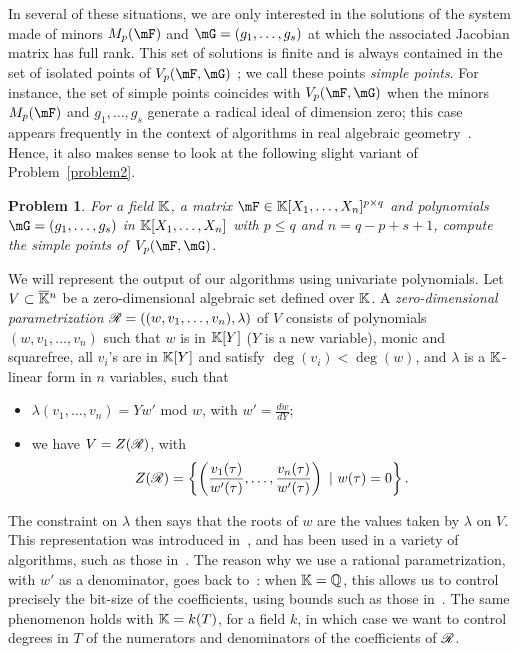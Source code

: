\documentclass[12pt]{article}
\newtheorem{pbm}{Problem}
\begin{document}
In several of these situations, we are only interested in the
solutions of the system made of minors $M_p(\mF)$ and
$\mG=(g_1,\dots,g_s)$ at which the associated Jacobian matrix has full
rank. This set of solutions is finite and is always contained in the
set of isolated points of $\VpFG{p}{\mF}{\mG}$ \cite[Theorem
  16.19]{Eisenbud95}; we call these points {\em simple points}. For
instance, the set of simple points coincides with $\VpFG{p}{\mF}{\mG}$
when the minors $M_p(\mF)$ and $g_1,\dots,g_s$ generate a radical
ideal of dimension zero; this case appears frequently in the context
of algorithms in real algebraic geometry~\cite{BGHSS}.  Hence, it also
makes sense to look at the following slight variant of
Problem~\eqref{problem2}.

\begin{pbm} \label{problem3} For a field $\mathbb{K}$, a matrix
  $\mF \in \KK[X_1,\dots,X_n]^{p \times q}$ and polynomials
  $\mG=(g_1,\dots,g_s)$ in $\mathbb{K}[X_1,\dots,X_n]$ with $p \leq q$ and
  $n = q-p+s+1$, compute the simple  points of~$\VpFG{p}{\mF}{\mG}$.
\end{pbm}

We will represent the output of our algorithms using univariate polynomials. Let
$V \subset \overline{\mathbb{K}}{}^n$ be a zero-dimensional algebraic set defined over $\mathbb{K}$. A
\emph{zero-dimensional parametrization} $\mathscr{R} = ((w,v_1, \ldots, v_n),
\lambda)$ of $V$ consists of polynomials $(w,v_1, \ldots, v_n)$ such that $w$ 
is in
$\mathbb{K}[Y]$ ($Y$ is a new variable), monic and squarefree, all $v_i$'s are in
$\mathbb{K}[Y]$ and satisfy $\deg(v_i) < \deg(w)$, and $\lambda$ is a $\mathbb{K}$-linear form
in $n$ variables, such that
\begin{itemize}
\item $\lambda(v_1, \ldots, v_n) = Yw'$ mod $w$, with $w'=\frac{d w}{d Y}$;
\item we have $V = Z(\mathscr{R})$, with $$Z(\mathscr{R})= \left\{\left(\frac{v_1(\tau)}{w'(\tau)}, \ldots, \frac{v_n(\tau)}{w'(\tau)}\right) \ | \ w(\tau) = 0\right\}.$$
\end{itemize}
The constraint on $\lambda$ then says that the roots of $w$ are the
values taken by $\lambda$ on $V$. This representation was introduced
in~\cite{Kronecker82,Macaulay16}, and has been used in a variety of
algorithms, such as those
in~\cite{GiMo89,GiHeMoPa95,ABRW,GiHeMoMoPa98,Rouillier99,GiLeSa01}.
The reason why we use a rational parametrization, with $w'$ as a
denominator, goes back to~\cite{ABRW,Rouillier99,GiLeSa01}: when
$\mathbb{K}=\mathbb{Q}$, this allows us to control precisely the bit-size of the
coefficients, using bounds such as those
in~\cite{Schost03,DaSc04}. The same phenomenon holds with $\mathbb{K}=k(T)$,
for a field $k$, in which case we want to control degrees in $T$ of
the numerators and denominators of the coefficients of $\mathscr{R}$.
\end{document}
